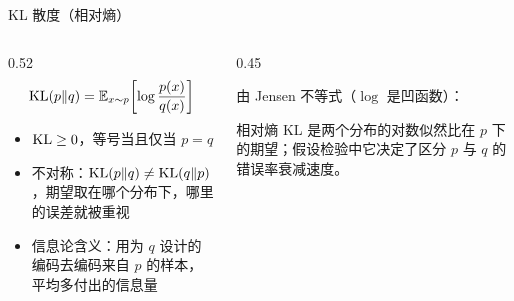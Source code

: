 \documentclass[aspectratio=169,10pt,UTF8,fontset=none]{ctexbeamer}
\begin{document}
\begin{frame}{KL 散度（相对熵）}
  \begin{columns}[T]
    \begin{column}{0.52\textwidth}
      \[
        \mathrm{KL}(p\Vert q)=\mathbb{E}_{x\sim p}\!\left[\log\frac{p(x)}{q(x)}\right]
      \]
      \begin{itemize}
        \item $\mathrm{KL}\geq0$，等号当且仅当 $p=q$
        \item 不对称：$\mathrm{KL}(p\Vert q)\neq\mathrm{KL}(q\Vert p)$，期望取在哪个分布下，哪里的误差就被重视
        \item 信息论含义：用为 $q$ 设计的编码去编码来自 $p$ 的样本，平均多付出的信息量
      \end{itemize}
    \end{column}
    \begin{column}{0.45\textwidth}
      \begin{keystep}[非负性]
        由 Jensen 不等式（$\log$ 是凹函数）：
      \end{keystep}
      \begin{concept}{相对熵}
        KL 是两个分布的对数似然比在 $p$ 下的期望；假设检验中它决定了区分 $p$ 与 $q$ 的错误率衰减速度。
      \end{concept}
    \end{column}
  \end{columns}
\end{frame}
\end{document}
